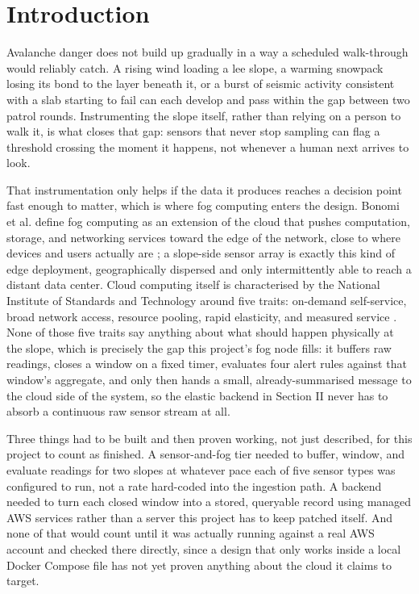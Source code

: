 \documentclass[conference]{IEEEtran}
\begin{document}
\section{Introduction}
Avalanche danger does not build up gradually in a way a scheduled walk-through would reliably catch. A rising wind loading a lee slope, a warming snowpack losing its bond to the layer beneath it, or a burst of seismic activity consistent with a slab starting to fail can each develop and pass within the gap between two patrol rounds. Instrumenting the slope itself, rather than relying on a person to walk it, is what closes that gap: sensors that never stop sampling can flag a threshold crossing the moment it happens, not whenever a human next arrives to look.

That instrumentation only helps if the data it produces reaches a decision point fast enough to matter, which is where fog computing enters the design. Bonomi et al. define fog computing as an extension of the cloud that pushes computation, storage, and networking services toward the edge of the network, close to where devices and users actually are \cite{ref1}; a slope-side sensor array is exactly this kind of edge deployment, geographically dispersed and only intermittently able to reach a distant data center. Cloud computing itself is characterised by the National Institute of Standards and Technology around five traits: on-demand self-service, broad network access, resource pooling, rapid elasticity, and measured service \cite{ref2}. None of those five traits say anything about what should happen physically at the slope, which is precisely the gap this project's fog node fills: it buffers raw readings, closes a window on a fixed timer, evaluates four alert rules against that window's aggregate, and only then hands a small, already-summarised message to the cloud side of the system, so the elastic backend in Section II never has to absorb a continuous raw sensor stream at all.

Three things had to be built and then proven working, not just described, for this project to count as finished. A sensor-and-fog tier needed to buffer, window, and evaluate readings for two slopes at whatever pace each of five sensor types was configured to run, not a rate hard-coded into the ingestion path. A backend needed to turn each closed window into a stored, queryable record using managed AWS services rather than a server this project has to keep patched itself. And none of that would count until it was actually running against a real AWS account and checked there directly, since a design that only works inside a local Docker Compose file has not yet proven anything about the cloud it claims to target.
\end{document}
